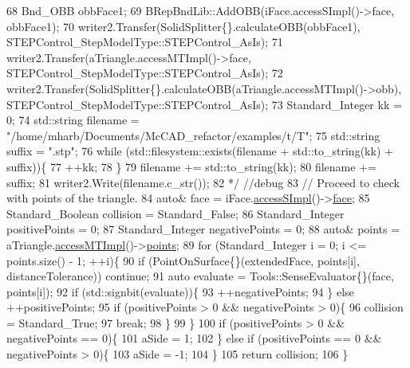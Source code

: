 \begin{DoxyCode}
68 \textcolor{comment}{    Bnd\_OBB obbFace1;}
69 \textcolor{comment}{    BRepBndLib::AddOBB(iFace.accessSImpl()->face, obbFace1);}
70 \textcolor{comment}{    writer2.Transfer(SolidSplitter\{\}.calculateOBB(obbFace1), STEPControl\_StepModelType::STEPControl\_AsIs);}
71 \textcolor{comment}{    writer2.Transfer(aTriangle.accessMTImpl()->face, STEPControl\_StepModelType::STEPControl\_AsIs);}
72 \textcolor{comment}{    writer2.Transfer(SolidSplitter\{\}.calculateOBB(aTriangle.accessMTImpl()->obb),
       STEPControl\_StepModelType::STEPControl\_AsIs);}
73 \textcolor{comment}{    Standard\_Integer kk = 0;}
74 \textcolor{comment}{    std::string filename = "/home/mharb/Documents/McCAD\_refactor/examples/t/T";}
75 \textcolor{comment}{    std::string suffix = ".stp";}
76 \textcolor{comment}{    while (std::filesystem::exists(filename + std::to\_string(kk) + suffix))\{}
77 \textcolor{comment}{        ++kk;}
78 \textcolor{comment}{    \}}
79 \textcolor{comment}{    filename += std::to\_string(kk);}
80 \textcolor{comment}{    filename += suffix;}
81 \textcolor{comment}{    writer2.Write(filename.c\_str());}
82 \textcolor{comment}{    */} \textcolor{comment}{//debug}
83     \textcolor{comment}{// Proceed to check with points of the triangle.}
84     \textcolor{keyword}{auto}& face = iFace.\hyperlink{classMcCAD_1_1Geometry_1_1Surface_a989de1f9ebe3de043412014ed25e52eb}{accessSImpl}()->\hyperlink{classMcCAD_1_1Geometry_1_1Surface_1_1Impl_abf7c4dc859404ce42b425c7d6b578f69}{face};
85     Standard\_Boolean collision = Standard\_False;
86     Standard\_Integer positivePoints = 0;
87     Standard\_Integer negativePoints = 0;
88     \textcolor{keyword}{auto}& points = aTriangle.\hyperlink{classMcCAD_1_1Geometry_1_1MeshTriangle_abd8b4e7b4f1dc5da17651c741bc6fada}{accessMTImpl}()->\hyperlink{classMcCAD_1_1Geometry_1_1MeshTriangle_1_1Impl_ab03401cf518b9b9576fdf1807a1db4bc}{points};
89     \textcolor{keywordflow}{for} (Standard\_Integer i = 0; i <= points.size() - 1; ++i)\{
90         \textcolor{keywordflow}{if} (PointOnSurface\{\}(extendedFace, points[i], distanceTolerance)) \textcolor{keywordflow}{continue};
91         \textcolor{keyword}{auto} evaluate = Tools::SenseEvaluator\{\}(face, points[i]);
92         \textcolor{keywordflow}{if} (std::signbit(evaluate))\{
93           ++negativePoints;
94         \} \textcolor{keywordflow}{else} ++positivePoints;
95         \textcolor{keywordflow}{if} (positivePoints > 0 && negativePoints > 0)\{
96           collision = Standard\_True;
97           \textcolor{keywordflow}{break};
98         \}
99     \}
100     \textcolor{keywordflow}{if} (positivePoints > 0 && negativePoints == 0)\{
101         aSide = 1;
102     \} \textcolor{keywordflow}{else} \textcolor{keywordflow}{if} (positivePoints == 0 && negativePoints > 0)\{
103         aSide = -1;
104     \}
105     \textcolor{keywordflow}{return} collision;
106 \}
\end{DoxyCode}
